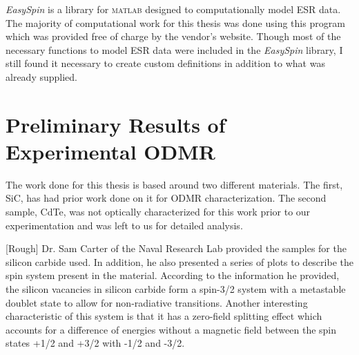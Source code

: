 \documentclass[oneside, astronomy, noacknowlegments]{BYUPhys}
\begin{document}
\textit{EasySpin} is a library for \textsc{matlab} designed to computationally model ESR data. The majority of computational work for this thesis was done using this program which was provided free of charge by the vendor's website. Though most of the necessary functions to model ESR data were included in the \textit{EasySpin} library, I still found it necessary to create custom definitions in addition to what was already supplied.

\section{Preliminary Results of Experimental ODMR}

The work done for this thesis is based around two different materials. The first, SiC, has had prior work done on it for ODMR characterization. The second sample, CdTe, was not optically characterized for this work prior to our experimentation and was left to us for detailed analysis.

[Rough] Dr. Sam Carter of the Naval Research Lab provided the samples for the silicon carbide used. In addition, he also presented a series of plots to describe the spin system present in the material. According to the information he provided, the silicon vacancies in silicon carbide form a spin-3/2 system with a metastable doublet state to allow for non-radiative transitions. Another interesting characteristic of this system is that it has a zero-field splitting effect which accounts for a difference of energies without a magnetic field between the spin states +1/2 and +3/2 with -1/2 and -3/2.
\end{document}

